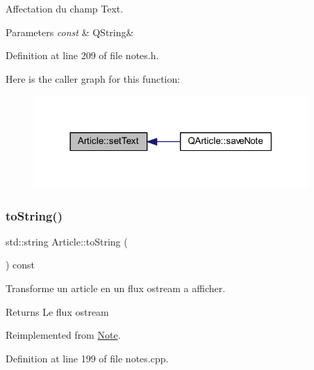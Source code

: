 Affectation du champ Text. 


\begin{DoxyParams}{Parameters}
{\em const} & Q\+String\& \\
\hline
\end{DoxyParams}


Definition at line 209 of file notes.\+h.

Here is the caller graph for this function\+:\nopagebreak
\begin{figure}[H]
\begin{center}
\leavevmode
\includegraphics[width=297pt]{class_article_a7144942027b1761cfcbd21761dd5cee8_icgraph}
\end{center}
\end{figure}
\mbox{\label{class_article_ae40d268ecffbaaa549968a81ea609ba4}} 
\subsubsection{\texorpdfstring{to\+String()}{toString()}}
{\footnotesize\ttfamily std\+::string Article\+::to\+String (\begin{DoxyParamCaption}{ }\end{DoxyParamCaption}) const\hspace{0.3cm}{\ttfamily [virtual]}}



Transforme un article en un flux ostream a afficher. 

\begin{DoxyReturn}{Returns}
Le flux ostream 
\end{DoxyReturn}


Reimplemented from \hyperlink{class_note_a1bd4acfbde0b71d05fd7d4ca889bca2b}{Note}.



Definition at line 199 of file notes.\+cpp.

